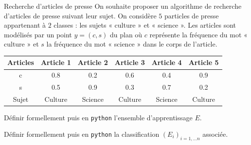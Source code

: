 \documentclass[12pt,fancy]{cours}
\begin{document}
\begin{exemple}{Recherche d'articles de presse}
    \label{ex:articles}
    On souhaite proposer un algorithme de recherche d'articles de presse suivant leur sujet. On considère $5$ particles de presse appartenant à $2$ classes : les sujets « culture » et « science ». Les articles sont modélisés par un point $y=(c,s)$ du plan où $c$ représente la fréquence du mot « culture » et $s$ la fréquence du mot « science » dans le corps de l'article.

    \begin{center}
        \begin{tabular}{|c|c|c|c|c|c|}
            \hline
            Articles & Article 1 & Article 2 & Article 3 & Article 4 & Article 5 \\
            \hline
            c & 0.8 & 0.2 & 0.6 & 0.4 & 0.9 \\
            \hline
            s & 0.5 & 0.9 & 0.3 & 0.7 & 0.2 \\
            \hline
            Sujet & Culture & Science & Culture & Science & Culture \\
            \hline
        \end{tabular}
    \end{center}

    \begin{quest}
        \item Définir formellement puis en \texttt{python} l'ensemble d'apprentissage $E$.
        \item Définir formellement puis en \texttt{python} la classification $(E_i)_{i=1,...n}$ associée.
    \end{quest}
    


\end{exemple}
\end{document}
